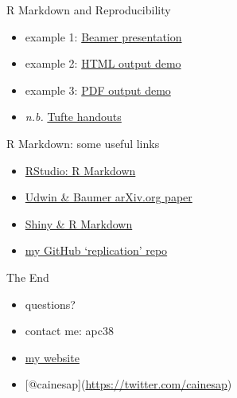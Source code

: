 \documentclass[ignorenonframetext,]{beamer}
\begin{document}
\begin{frame}{R Markdown and Reproducibility}

\begin{itemize}[<+->]
\itemsep1pt\parskip0pt
\item
  example 1:
  \href{https://github.com/cainesap/replication/blob/master/slides.Rmd}{Beamer
  presentation}
\item
  example 2:
  \href{https://raw.githubusercontent.com/cainesap/replication/master/html_doc.Rmd}{HTML
  output demo}
\item
  example 3:
  \href{https://raw.githubusercontent.com/cainesap/replication/master/shiny_doc.Rmd}{PDF
  output demo}
\item
  \emph{n.b.}
  \href{http://rmarkdown.rstudio.com/tufte_handout_format.html}{Tufte
  handouts}
\end{itemize}

\end{frame}

\begin{frame}{R Markdown: some useful links}

\begin{itemize}
\itemsep1pt\parskip0pt
\item
  \href{http://rmarkdown.rstudio.com/}{RStudio: R Markdown}
\item
  \href{http://arxiv.org/abs/1501.01613}{Udwin \& Baumer arXiv.org
  paper}
\item
  \href{http://shiny.rstudio.com/articles/interactive-docs.html}{Shiny
  \& R Markdown}
\item
  \href{https://github.com/cainesap/replication}{my GitHub `replication'
  repo}
\end{itemize}

\end{frame}

\begin{frame}{The End}

\begin{itemize}
\itemsep1pt\parskip0pt
\item
  questions?
\item
  contact me: apc38
\item
  \href{http://apc38.user.srcf.net/}{my website}
\item
  {[}@cainesap{]}(\url{https://twitter.com/cainesap})
\end{itemize}

\end{frame}
\end{document}
